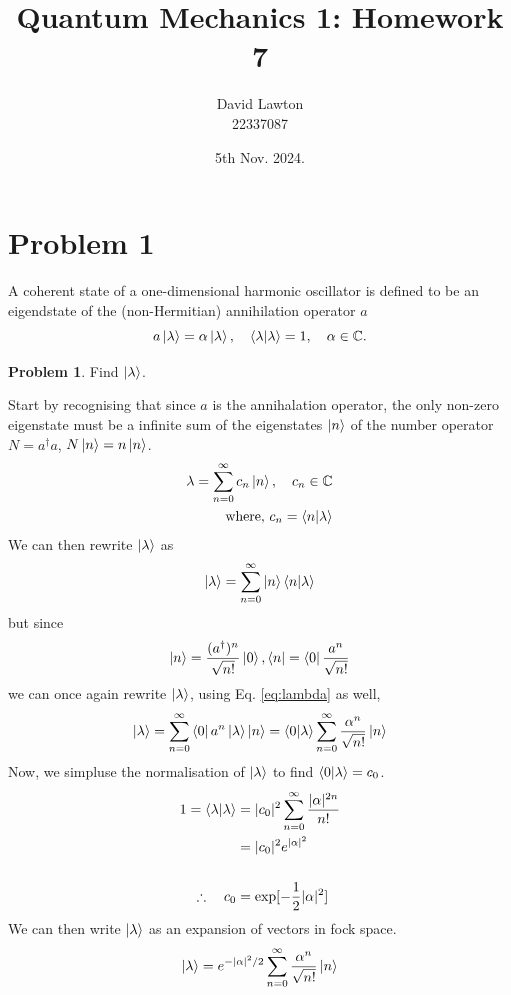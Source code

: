\documentclass{article}
\title{Quantum Mechanics 1: Homework 7}
\author{David Lawton\\
        22337087}
\date{5th Nov. 2024.}
\theoremstyle{definition}
\newtheorem{definition}{Problem}[section]
\theoremstyle{remark}
\begin{document}
\maketitle

\tableofcontents

\section{Problem 1}
A coherent state of a one-dimensional harmonic oscillator is defined to be an eigendstate of the (non-Hermitian) annihilation operator $a$
\begin{equation}
    a\ket{\lambda} = \alpha\ket{\lambda}, \quad \braket{\lambda|\lambda} = 1, \quad \alpha \in \mathbb{C}.
\end{equation}




\begin{definition}
    Find $\ket{\lambda}$.
\end{definition}
Start by recognising that since $a$ is the annihalation operator, the only non-zero eigenstate must be a infinite sum of the eigenstates $\ket{n}$ of the number operator $N = a^\dagger a$, $N\ket{n}=n\ket{n}$.
\begin{align*}
    \lambda = \sum_{n=0}^\infty c_n\ket{n}, \quad c_n \in \mathbb{C}\\
    \text{ where, } c_n = \braket{n|\lambda}
\end{align*}
We can then rewrite $\ket{\lambda}$ as
\begin{equation*}
    \ket{\lambda} = \sum_{n=0}^\infty \ket{n}\braket{n|\lambda}
\end{equation*}
but since 
\begin{equation}
    \label{eq:n state in vacuum terms}
    \ket{n}=\frac{(a^\dagger)^n}{\sqrt{n!}}\ket{0}, \bra{n}=\bra{0}\frac{a^n}{\sqrt{n!}}
\end{equation}
we can once again rewrite $\ket{\lambda}$, using Eq. \ref{eq:lambda} as well,
\begin{equation*}
    \ket{\lambda} = \sum_{n=0}^\infty \bra{0}a^n\ket{\lambda}\ket{n}=\braket{0|\lambda}\sum_{n=0}^{\infty}\frac{\alpha^n}{\sqrt{n!}}\ket{n}
\end{equation*}
Now, we simpluse the normalisation of $\ket{\lambda}$ to find $\braket{0|\lambda}=c_0$.
\begin{align*}
    1 = \braket{\lambda|\lambda} &= |c_0|^2\sum_{n=0}^\infty\frac{|\alpha|^{2n}}{n!}\\
    &= |c_0|^2e^{|\alpha|^2}\\
    ~\\
    \therefore\quad c_0&=\exp[-\frac{1}{2}|\alpha|^2]
\end{align*}
We can then write $\ket{\lambda}$ as an expansion of vectors in fock space.
\begin{equation}
    \label{eq:lambda}
    \ket{\lambda} = e^{-|\alpha|^2/2}\sum_{n=0}^\infty\frac{\alpha^n}{\sqrt{n!}}\ket{n}
\end{equation}
\end{document}
